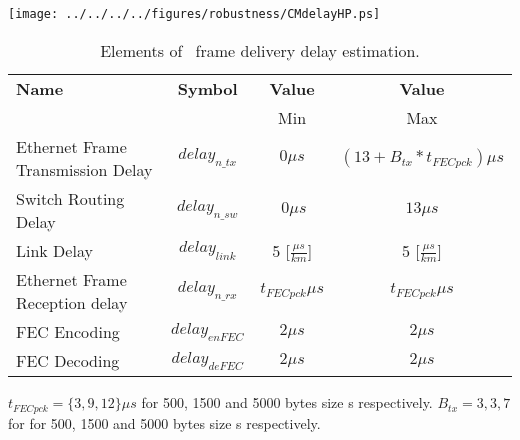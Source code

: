 \begin{center}
	\texttt{[image: ../../../../figures/robustness/CMdelayHP.ps]}
	\label{fig:CMdelayHP}
\end{center}

\begin{table}[ht]
\caption{Elements of \ControlMessage\ frame delivery delay estimation.} 
\centering
	\begin{tabular}{| l |  c | c | c |}          \hline
\textbf{Name}&\textbf{Symbol}&\textbf{Value}&\textbf{Value}                  \\
                                 &                &  Min& Max          \\ \hline
Ethernet Frame Transmission Delay&$delay_{n\_tx}$&$0\mu s$&$(13 + B_{tx}
*t_{FECpck})
\mu s$
\\ \hline
Switch Routing Delay            &$delay_{n\_sw}$&$~0\mu s$&$13\mu s$ 
 
\\ \hline
Link Delay                       & $delay_{link}$ &5 [$\frac{\mu
s}{km}$]&5 [$\frac{\mu s}{km}$]      
\\ \hline
Ethernet Frame Reception delay   & $delay_{n\_rx}$&$t_{FECpck}\mu
s$&$t_{FECpck}\mu s$
\\ \hline
FEC Encoding                     & $delay_{enFEC}$&$2\mu s$&$2\mu s$
\\ \hline
FEC Decoding                     & $delay_{deFEC}$&$2\mu s$&$2\mu s$
\\ \hline

\end{tabular}
\label{tab:CMdelayHP}
\end{table}

$t_{FECpck} = \{3,9,12\} \mu s$ for 500, 1500 and 5000 bytes size
\ControlMessage s respectively.
$B_{tx} = {3,3,7}$ for for 500, 1500 and 5000 bytes size \ControlMessage s
respectively.
 
